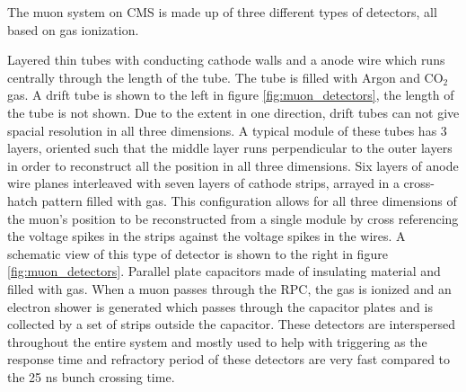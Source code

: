     The muon system on CMS is made up of three different types of detectors, all based on gas ionization.
    \begin{enumerate}
      Layered thin tubes with conducting cathode walls and a anode wire which runs centrally through the length of the tube. The tube is filled with Argon and CO$_2$ gas. A drift tube is shown to the left in figure \ref{fig:muon_detectors}, the length of the tube is not shown. Due to the extent in one direction, drift tubes can not give spacial resolution in all three dimensions. A typical module of these tubes has 3 layers, oriented such that the middle layer runs perpendicular to the outer layers in order to reconstruct all the position in all three dimensions. 
      Six layers of anode wire planes interleaved with seven layers of cathode strips, arrayed in a cross-hatch pattern filled with gas. This configuration allows for all three dimensions of the muon's position to be reconstructed from a single module by cross referencing the voltage spikes in the strips against the voltage spikes in the wires. A schematic view of this type of detector is shown to the right in figure \ref{fig:muon_detectors}.
      Parallel plate capacitors made of insulating material and filled with gas. When a muon passes through the RPC, the gas is ionized and an electron shower is generated which passes through the capacitor plates and is collected by a set of strips outside the capacitor. These detectors are interspersed throughout the entire system and mostly used to help with triggering as the response time and refractory period of these detectors are very fast compared to the 25 ns bunch crossing time. 
    \end{enumerate}

